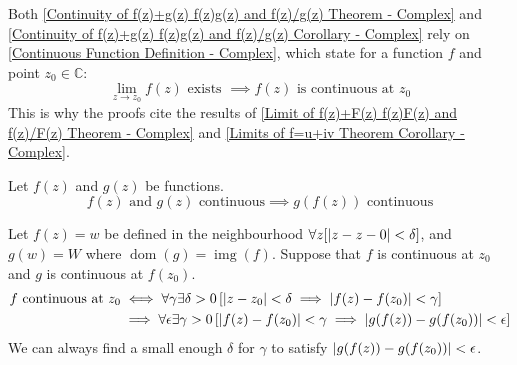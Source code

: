 \documentclass[12pt, english]{book}
\makeatletter
\renewenvironment{proof}[1][\proofname]{\par
	\pushQED{\qed}%
	\normalfont \topsep6\p@\@plus6\p@\relax
	\list{}{%
		\settowidth{\leftmargin}{\itshape\proofname:\hskip\labelsep}%
		\setlength{\labelwidth}{0pt}%
		\setlength{\itemindent}{-\leftmargin}%
	}%
	\item[\hskip\labelsep\itshape#1\@addpunct{:}]\ignorespaces
	}{ \popQED\endlist\@endpefalse}
\makeatother
\begin{document}
	\begin{observation}
		Both \cref{Continuity of f(z)+g(z) f(z)g(z) and f(z)/g(z) Theorem - Complex} and \cref{Continuity of f(z)+g(z) f(z)g(z) and f(z)/g(z) Corollary - Complex} rely on \cref{Continuous Function Definition - Complex}, which state for a function $f$ and point $z_0 \in \mathbb{C}$:
		$$\lim_{z \rightarrow z_0} f(z) \text{ exists } \implies f(z) \text{ is continuous at } z_0$$
		This is why the proofs cite the results of \cref{Limit of f(z)+F(z) f(z)F(z) and f(z)/F(z) Theorem - Complex} and \cref{Limits of f=u+iv Theorem Corollary - Complex}.
	\end{observation}

	\begin{theorem}
		Let $f(z)$ and $g(z)$ be functions.
		$$f(z) \text{ and } g(z) \text{ continuous} \implies g(f(z)) \text{ continuous}$$
		\label{Continuity of Composition of Functions Theorem - Complex}
	\end{theorem}
	\begin{proof}
		Let $f(z) = w$ be defined in the neighbourhood $\forall z[\abs{z-z-0}<\delta]$, and $g(w) = W$ where $\operatorname{dom} (g) = \operatorname{img}(f)$. Suppose that $f$ is continuous at $z_0$ and $g$ is continuous at $f(z_0)$.
		\begin{align*}
			f \text{ continuous at } z_0 
			&\iff \forall \gamma \exists \delta>0 \left[ \abs{z-z_0} < \delta \implies \abs{f(z) - f(z_0)}<\gamma \right] \\
			&\implies \forall \epsilon \exists \gamma>0 \left[ \abs{f(z) - f(z_0)} < \gamma \implies \abs{g(f(z)) - g(f(z_0))} < \epsilon \right]
		\end{align*} 
		We can always find a small enough $\delta$ for $\gamma$ to satisfy $\abs{g(f(z)) - g(f(z_0))} < \epsilon$.
	\end{proof}
\end{document}

